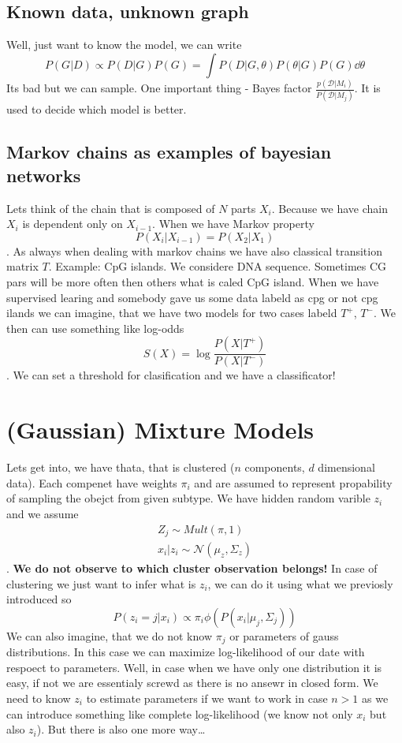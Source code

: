 \documentclass[12pt,a4paper]{article}
\begin{document}
\subsection{Known data, unknown graph}
Well, just want to know the model, we can write
\begin{equation}
    P(G|D)\propto P(D|G)P(G)=\int P(D|G,\theta)P(\theta|G)P(G)\dd\theta
\end{equation}
Its bad but we can sample. One important thing - Bayes factor $\frac{p(\mathcal{D}|M_i)}{P(\mathcal{D}|M_j)}$. It is used to decide which model is better.
\subsection{Markov chains as examples of bayesian networks}
Lets think of the chain that is composed of $N$ parts $X_i$. Because we have chain $X_i$ is dependent only on $X_{i-1}$. When we have Markov property 
\begin{equation}
    P(X_i|X_{i-1})=P(X_2|X_1)
\end{equation}.
As always when dealing with markov chains we have also classical transition matrix $T$. Example: CpG islands. We considere DNA sequence. Sometimes
CG pars will be more often then others what is caled CpG island. When we have supervised learing and somebody gave us some data labeld as cpg or not cpg ilands we can imagine, that
we have two models for two cases labeld $T^+$, $T^-$. We then can use something like log-odds 
\begin{equation}
    S(X)=\log{\frac{P(X|T^+)}{P(X|T^-)}}
\end{equation}. We can set a threshold for clasification and we have a classificator!
\section{(Gaussian) Mixture Models}
Lets get into, we have thata, that is clustered ($n$ components, $d$ dimensional data). Each compenet have weights $\pi_i$ and are assumed to represent propability of sampling the obejct from given 
subtype. We have hidden random varible $z_i$ and we assume
\begin{align*}
    Z_j \sim Mult(\pi,1)\\
    x_i|z_i\sim \mathcal{N}(\mu_z,\Sigma_z)
\end{align*}.
\textbf{We do not observe to which cluster observation belongs!} In case of clustering we just want to infer what is $z_i$, we can do it using what we previosly introduced so
\begin{equation}
    P(z_i=j|x_i)\propto\pi_i\phi(P(x_i|\mu_j,\Sigma_j))
\end{equation}
We can also imagine, that we do not know $\pi_j$ or parameters of gauss distributions. In this case we can maximize log-likelihood of our date with respoect to parameters. Well, in case when
we have only one distribution it is easy, if not we are essentialy screwd as there is no ansewr in closed form. We need to know $z_i$ to estimate parameters if we want to work in case $n>1$ as 
we can introduce something like complete log-likelihood (we know not only $x_i$ but also $z_i$). But there is also one more way\ldots
\end{document}
